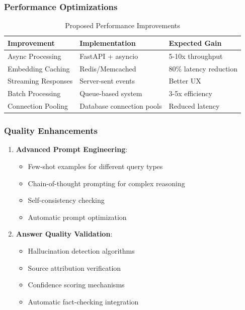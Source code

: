 \documentclass[12pt,a4paper]{article}
\begin{document}
\subsubsection{Performance Optimizations}

\begin{table}[H]
\centering
\begin{tabular}{@{}lll@{}}
\toprule
\textbf{Improvement} & \textbf{Implementation} & \textbf{Expected Gain} \\
\midrule
Async Processing & FastAPI + asyncio & 5-10x throughput \\
Embedding Caching & Redis/Memcached & 80\% latency reduction \\
Streaming Responses & Server-sent events & Better UX \\
Batch Processing & Queue-based system & 3-5x efficiency \\
Connection Pooling & Database connection pools & Reduced latency \\
\bottomrule
\end{tabular}
\caption{Proposed Performance Improvements}
\end{table}

\subsubsection{Quality Enhancements}

\begin{enumerate}
    \item \textbf{Advanced Prompt Engineering}:
    \begin{itemize}
        \item Few-shot examples for different query types
        \item Chain-of-thought prompting for complex reasoning
        \item Self-consistency checking
        \item Automatic prompt optimization
    \end{itemize}
    
    \item \textbf{Answer Quality Validation}:
    \begin{itemize}
        \item Hallucination detection algorithms
        \item Source attribution verification
        \item Confidence scoring mechanisms
        \item Automatic fact-checking integration
    \end{itemize}
\end{enumerate}
\end{document}
